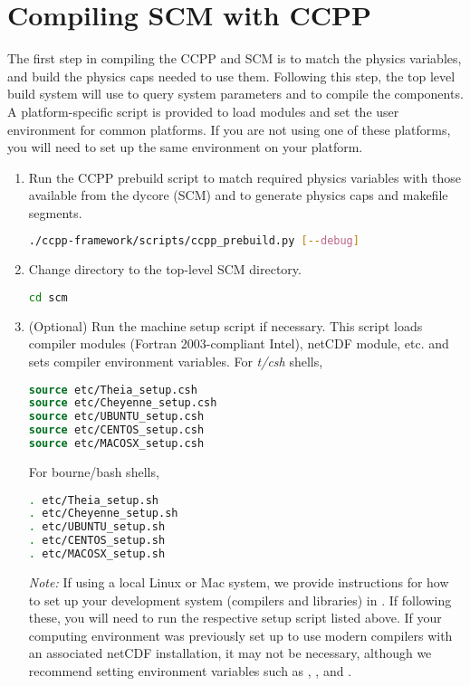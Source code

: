 \section{Compiling SCM with CCPP}
\label{section: compiling}
The first step in compiling the CCPP and SCM is to match the physics variables, and build the physics caps needed to use them.  Following this step, the top level build system will use  to query system parameters and  to compile the components.  A platform-specific script is provided to load modules and set the user environment for common platforms.  If you are not using one of these platforms, you will need to set up the same environment on your platform.
\begin{enumerate}
    \item Run the CCPP prebuild script to match required physics variables with those available from the dycore (SCM) and to generate physics caps and makefile segments.
\begin{lstlisting}[language=bash]
./ccpp-framework/scripts/ccpp_prebuild.py [--debug]
\end{lstlisting}
    \item Change directory to the top-level SCM directory.
\begin{lstlisting}[language=bash]
cd scm
\end{lstlisting}
    \item (Optional) Run the machine setup script if necessary. This script loads compiler modules (Fortran 2003-compliant Intel), netCDF module, etc. and sets compiler environment variables. For \textit{t/csh} shells,
\begin{lstlisting}[language=csh]
source etc/Theia_setup.csh
source etc/Cheyenne_setup.csh
source etc/UBUNTU_setup.csh
source etc/CENTOS_setup.csh
source etc/MACOSX_setup.csh
\end{lstlisting}
For bourne/bash shells,
\begin{lstlisting}[language=bash]
. etc/Theia_setup.sh
. etc/Cheyenne_setup.sh
. etc/UBUNTU_setup.sh
. etc/CENTOS_setup.sh
. etc/MACOSX_setup.sh
\end{lstlisting}
\emph{Note:} If using a local Linux or Mac system, we provide instructions for how to set up your development system (compilers and libraries) in . If following these, you will need to run the respective setup script listed above. If your computing environment was previously set up to use modern compilers with an associated netCDF installation, it may not be necessary, although we recommend setting environment variables such as , , and .


\end{enumerate}
